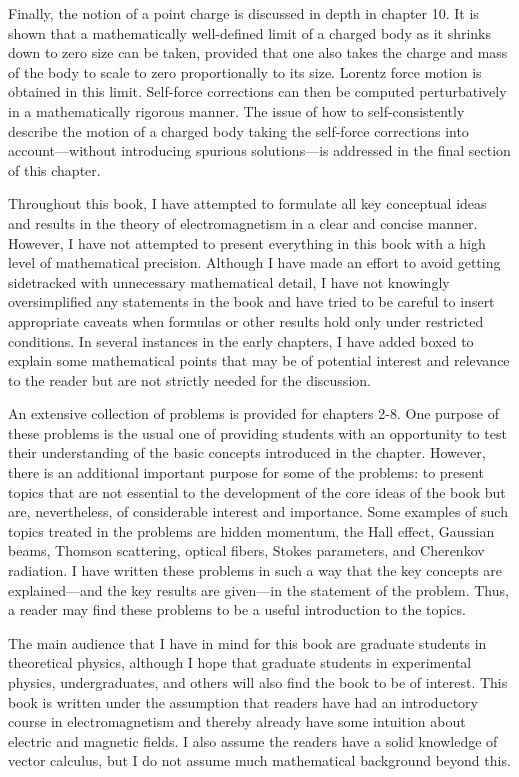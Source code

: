 Finally, the notion of a point charge is discussed in depth in chapter 10. It is shown that a mathematically well-defined limit of a charged body as it shrinks down to  zero size can be taken, provided that one also takes the charge and mass of the body to scale to zero proportionally to its size. Lorentz force motion is obtained in this limit. Self-force corrections can then be computed perturbatively in a mathematically rigorous manner. The issue of how to self-consistently describe the motion of a charged body taking the self-force corrections into account---without introducing spurious  solutions---is addressed in the final section of this chapter.

Throughout this book, I have attempted to formulate all key conceptual ideas and results in the theory of electromagnetism in a clear and concise manner. However, I have not attempted to present everything in this book with a high level of mathematical precision. Although I have made an effort to avoid getting sidetracked with unnecessary mathematical detail, I have not knowingly oversimplified any statements in the book and have tried to be careful to insert appropriate caveats when formulas or other results hold only under restricted conditions. In several instances in the early chapters, I have added boxed  to explain some mathematical points that may be of potential interest and relevance to the reader but are not strictly needed for the discussion.

An extensive collection of problems is provided for chapters 2-8. One purpose of these problems is the usual one of providing students with an opportunity to test their understanding of the basic concepts introduced in the chapter. However, there is an additional important purpose for some of the problems: to present topics that are not essential to the development of the core ideas of the book but are, nevertheless, of considerable interest and importance. Some examples of such topics treated in the problems are hidden momentum, the Hall effect, Gaussian beams, Thomson scattering, optical fibers, Stokes parameters, and Cherenkov radiation. I have written these problems in such a way that the key concepts are explained---and the key results are given---in the statement of the problem. Thus, a reader may find these problems to be a useful introduction to the topics.

The main audience that I have in mind for this book are graduate students in theoretical physics, although I hope that graduate students in experimental physics, undergraduates, and others will also find the book to be of interest. This book is written under the assumption that readers have had an introductory course in electromagnetism and thereby already have some intuition about electric and magnetic fields. I also assume the readers have a solid knowledge of vector calculus, but I do not assume much mathematical background beyond this.

